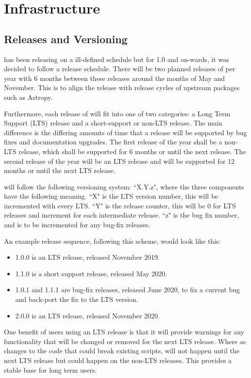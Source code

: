 \section{Infrastructure}
\label{sec:infrastructure}

\subsection{Releases and Versioning}

\sunpyproj has been releasing on a ill-defined schedule but for 1.0 and on-wards, it was decided to follow a release schedule.
There will be two planned releases of \sunpypkg per year with 6 months between these releases around the months of May and November.
This is to align the release with release cycles of upstream packages such as Astropy.

Furthermore, each release of \sunpypkg will fit into one of two categories: a Long Term Support (LTS) release and a short-support or non-LTS release.
The main difference is the differing amounts of time that a release will be supported by bug fixes and documentation upgrades.
The first release of the year shall be a non-LTS release, which shall be supported for 6 months or until the next release.
The second release of the year will be an LTS release and will be supported for 12 months or until the next LTS release.

\sunpypkg will follow the following versioning system: ``X.Y.z", where the three components have the following meaning.
``X" is the LTS version number, this will be incremented with every LTS.
``Y" is the release counter, this will be 0 for LTS releases and increment for each intermediate release.
``z" is the bug fix number, and is to be incremented for any bug-fix releases.

An example release sequence, following this scheme, would look like this:

\begin{itemize}
\itemsep0em
\item 1.0.0 is an LTS release, released November 2019.
\item 1.1.0 is a short support release, released May 2020.
\item 1.0.1 and 1.1.1 are bug-fix releases, released June 2020, to fix a current bug and back-port the fix to the LTS version.
\item 2.0.0 is an LTS release, released November 2020.
\end{itemize}

One benefit of users using an LTS release is that it will provide warnings for any functionality that will be changed or removed for the next LTS release.
Where as changes to the code that could break existing scripts, will not happen until the next LTS release but could happen on the non-LTS releases.
This provides a stable base for long term \sunpypkg users.

